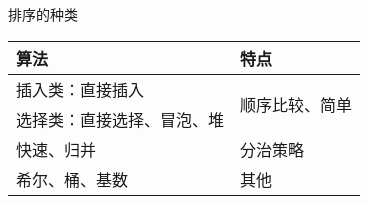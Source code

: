 \begin{frame}
    \frametitle{\insertsectionhead}
    \begin{block}{排序的种类}
        \begin{table}
            \centering
            \smaller
            \begin{tabular}{l|l}
                \toprule
                \textbf{算法}                   & \textbf{特点}              \\
                \midrule
                插入类：\alert{直接插入}              & \multirow{2}{*}{顺序比较、简单} \\
                选择类：\alert{直接选择}、\alert{冒泡}、堆 &                          \\
                \midrule
                \alert{快速}、归并                 & 分治策略                     \\
                \midrule
                希尔、桶、基数                       & 其他                       \\
                \bottomrule
            \end{tabular}
        \end{table}
    \end{block}
\end{frame}

